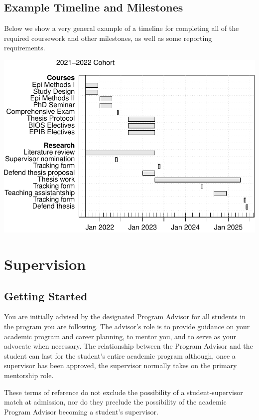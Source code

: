 \documentclass[
]{book}
\begin{document}
\hypertarget{example-timeline-and-milestones}{%
\section{Example Timeline and Milestones}\label{example-timeline-and-milestones}}

Below we show a very general example of a timeline for completing all of the required coursework and other milestones, as well as some reporting requirements.

\includegraphics{01-Introduction_files/figure-latex/plan-1.pdf}

\hypertarget{supervision}{%
\chapter{Supervision}\label{supervision}}

\hypertarget{getting-started}{%
\section{Getting Started}\label{getting-started}}

You are initially advised by the designated Program Advisor for all students in the program you are following. The advisor's role is to provide guidance on your academic program and career planning, to mentor you, and to serve as your advocate when necessary. The relationship between the Program Advisor and the student can last for the student's entire academic program although, once a supervisor has been approved, the supervisor normally takes on the primary mentorship role.

These terms of reference do not exclude the possibility of a student-supervisor match at admission, nor do they preclude the possibility of the academic Program Advisor becoming a student's supervisor.
\end{document}
